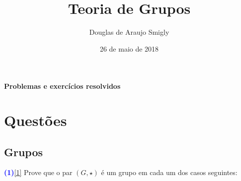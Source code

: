 \documentclass[12pt, a4paper]{article}
\title{Teoria de Grupos}
\author{Douglas de Araujo Smigly}
\date{26 de maio de 2018}
\begin{document}
\maketitle
\begin{center}
\large\textbf{\textcolor{Floresta}{Problemas e exercícios resolvidos}}\\
\end{center}
\section{Questões}
\subsection{\textcolor{Floresta}{Grupos}}
\textcolor{blue}{\bf(1)}\ref{1} Prove que o par $(G, \star)$ é um grupo em cada um dos casos seguintes:
\end{document}
